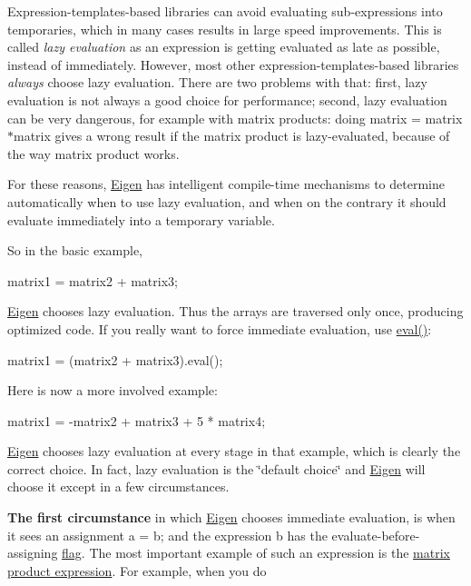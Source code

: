 Expression-\/templates-\/based libraries can avoid evaluating sub-\/expressions into temporaries, which in many cases results in large speed improvements. This is called {\itshape lazy evaluation} as an expression is getting evaluated as late as possible, instead of immediately. However, most other expression-\/templates-\/based libraries {\itshape always} choose lazy evaluation. There are two problems with that\+: first, lazy evaluation is not always a good choice for performance; second, lazy evaluation can be very dangerous, for example with matrix products\+: doing {\ttfamily matrix = matrix$\ast$matrix} gives a wrong result if the matrix product is lazy-\/evaluated, because of the way matrix product works.

For these reasons, \hyperlink{namespace_eigen}{Eigen} has intelligent compile-\/time mechanisms to determine automatically when to use lazy evaluation, and when on the contrary it should evaluate immediately into a temporary variable.

So in the basic example,


\begin{DoxyCode}
matrix1 = matrix2 + matrix3; 
\end{DoxyCode}


\hyperlink{namespace_eigen}{Eigen} chooses lazy evaluation. Thus the arrays are traversed only once, producing optimized code. If you really want to force immediate evaluation, use \hyperlink{group___core___module_a5df64c66228ba75bbc66db2584185527}{eval()}\+:


\begin{DoxyCode}
matrix1 = (matrix2 + matrix3).eval(); 
\end{DoxyCode}


Here is now a more involved example\+:


\begin{DoxyCode}
matrix1 = -matrix2 + matrix3 + 5 * matrix4; 
\end{DoxyCode}


\hyperlink{namespace_eigen}{Eigen} chooses lazy evaluation at every stage in that example, which is clearly the correct choice. In fact, lazy evaluation is the \char`\"{}default choice\char`\"{} and \hyperlink{namespace_eigen}{Eigen} will choose it except in a few circumstances.

{\bfseries The first circumstance} in which \hyperlink{namespace_eigen}{Eigen} chooses immediate evaluation, is when it sees an assignment {\ttfamily a = b;} and the expression {\ttfamily b} has the evaluate-\/before-\/assigning \hyperlink{group__flags}{flag}. The most important example of such an expression is the \hyperlink{group___core___module}{matrix product expression}. For example, when you do


